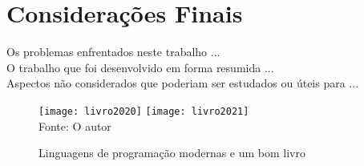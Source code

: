 

\chapter{Considera\c{c}\~{o}es Finais}
Os problemas enfrentados neste trabalho ...\\
O trabalho que foi desenvolvido em forma resumida ...\\
Aspectos n\~{a}o considerados que poderiam ser estudados ou \'{u}teis para ...\\



   \begin{figure}[H]
    \begin{center}
        \caption{Linguagens de programa\c{c}\~{a}o modernas e um bom livro} \label{ling2}
        \texttt{[image: livro2020]}
        \texttt{[image: livro2021]} \\
        {\tiny \sf Fonte: O autor }
    \end{center}
   \end{figure} 